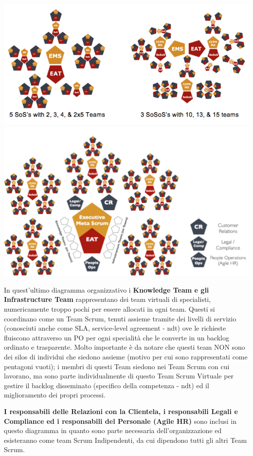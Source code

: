 \documentclass[12pt,a4paper,parskip=full]{scrartcl}
\begin{document}
\includegraphics[width=1.0\linewidth]{VariableSoS-R2.png}
\includegraphics[width=1.0\linewidth]{OrganizationalDiagram.png}

In quest'ultimo diagramma organizzativo i \textbf{Knowledge Team e gli Infrastructure
Team} rappresentano dei team virtuali di specialisti, numericamente troppo pochi per essere allocati in ogni team. Questi si coordinano come un Team Scrum, tenuti assieme tramite dei livelli di servizio (conosciuti anche come SLA, service-level agreement - ndt) ove le richieste fluiscono attraverso un PO per ogni specialità che le converte in un backlog ordinato e trasparente. Molto importante è da notare che questi team NON sono dei silos di individui che siedono assieme (motivo per cui sono rappresentati come pentagoni vuoti); i membri di questi Team siedono nei Team Scrum con cui lavorano, ma sono parte individualmente di  questo Team Scrum Virtuale per gestire il backlog disseminato (specifico della competenza - ndt) ed il miglioramento dei propri processi.

\textbf{I responsabili delle Relazioni con la Clientela, i responsabili Legali e Compliance ed i responsabili del Personale (Agile HR)} sono inclusi in questo diagramma in quanto sono parte necessaria dell'organizzazione ed esisteranno come team Scrum Indipendenti, da cui dipendono tutti gli altri Team Scrum.
\end{document}
